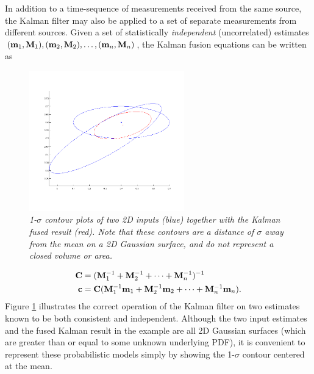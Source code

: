 In addition to a time-sequence of measurements received from the same source, the Kalman filter may also be applied to a
set of separate measurements from different sources. Given a set of statistically {\em independent} (uncorrelated) estimates
$(\mathbf{m}_1,\mathbf{M}_1),(\mathbf{m}_2,\mathbf{M}_2),\dots,(\mathbf{m}_n,\mathbf{M}_n)$, the Kalman fusion equations can be written
as~\cite{uhlmann03,maybeck79}
\begin{figure}[tbp]
    \centering\includegraphics[width=0.6\textwidth]{figures/kalman2d.png}
    \caption{\it 1-$\sigma$ contour plots of two 2D inputs (blue) together with the Kalman fused result (red). Note that
        these contours are a distance of $\sigma$ away from the mean on a 2D Gaussian surface, and do not represent a
        closed volume or area. }
    \label{fig:kalman2d}
\end{figure}
\begin{align}
    \mathbf{C} &= (\mathbf{M}^{-1}_1+\mathbf{M}^{-1}_2+\dots+\mathbf{M}^{-1}_n)^{-1}\label{eqn:kalmanP}\\
    \mathbf{c} &= \mathbf{C}(\mathbf{M}^{-1}_1\mathbf{m}_1+\mathbf{M}^{-1}_2\mathbf{m}_2+\dots+\mathbf{M}^{-1}_n\mathbf{m}_n).\label{eqn:kalmanx}
\end{align}
Figure \ref{fig:kalman2d} illustrates the correct operation of the Kalman filter on two estimates known to be both
consistent and independent. Although the two input estimates and the fused Kalman result in the example are all 2D
Gaussian surfaces (which are greater than or equal to some unknown underlying PDF), it is convenient to represent these
probabilistic models simply by showing the 1-$\sigma$ contour centered at the mean.

